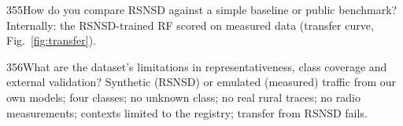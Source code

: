 \begin{qa}{355}{How do you compare RSNSD against a simple baseline or public benchmark?}
Internally: the RSNSD-trained RF scored on measured data (transfer curve, Fig.~\ref{fig:transfer}).
\end{qa}

\begin{qa}{356}{What are the dataset's limitations in representativeness, class coverage and external validation?}
Synthetic (RSNSD) or emulated (measured) traffic from our own models; four classes; no unknown class; no real rural
traces; no radio measurements; contexts limited to the registry; transfer from RSNSD fails.
\end{qa}
